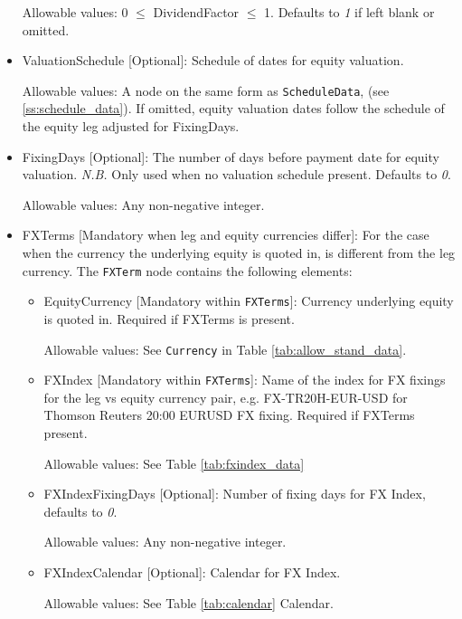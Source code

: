 \begin{itemize}
Allowable values: 0 $\leq$ DividendFactor $\leq$  1.   Defaults to \emph{1} if left blank or omitted.

\item ValuationSchedule [Optional]: Schedule of dates for equity valuation.

Allowable values: A node on the same form as \lstinline!ScheduleData!, (see \ref{ss:schedule_data}). If omitted, equity valuation dates follow the schedule of the equity leg adjusted for FixingDays.

\item FixingDays [Optional]: The number of days before payment date for equity valuation. \emph{N.B.} Only used when no valuation schedule present. Defaults to \emph{0}.

Allowable values: Any non-negative integer.

\item FXTerms [Mandatory when leg and equity currencies differ]: For the case when the currency  the underlying equity is quoted in, is different from the leg currency.  The \lstinline!FXTerm! node contains the following elements:
\begin{itemize}
	\item EquityCurrency [Mandatory within \lstinline!FXTerms!]: Currency underlying equity is quoted in. Required if FXTerms is present.

	Allowable values: See \lstinline!Currency! in Table \ref{tab:allow_stand_data}.

	\item FXIndex [Mandatory within \lstinline!FXTerms!]: Name of the index for FX fixings for the leg vs equity currency pair, e.g. FX-TR20H-EUR-USD for Thomson Reuters 20:00 EURUSD FX fixing. Required if FXTerms present.

	Allowable values:  See Table \ref{tab:fxindex_data}

	\item FXIndexFixingDays [Optional]: Number of fixing days for FX Index, defaults to \emph{0}.

	Allowable values: Any non-negative integer.

	\item FXIndexCalendar [Optional]: Calendar for FX Index.

	Allowable values: See Table \ref{tab:calendar} Calendar.
\end{itemize}
\end{itemize}

